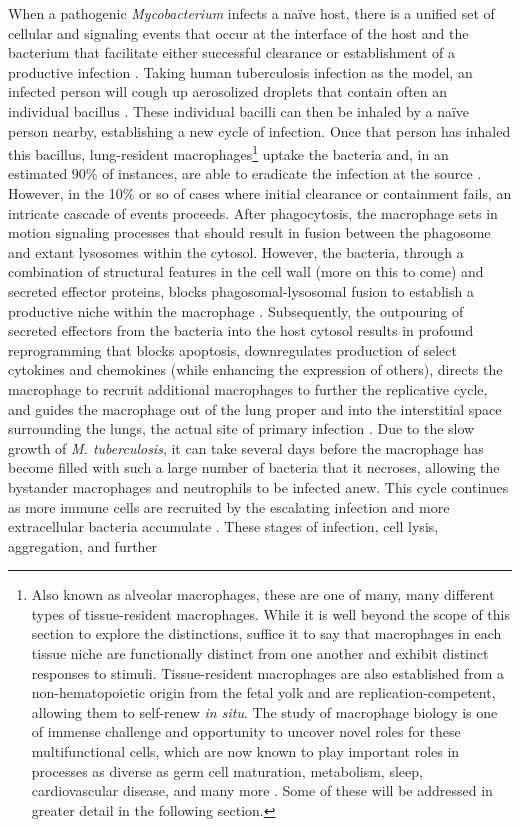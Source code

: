 When a pathogenic \textit{Mycobacterium} infects a na\"{i}ve host, there is a unified set of cellular and signaling events that occur at the interface of the host and the bacterium that facilitate either successful clearance or establishment of a productive infection \citep{Davies2001, Bohrer2021, Gagneux2006, Turner2017}. Taking human tuberculosis infection as the model, an infected person will cough up aerosolized droplets that contain often an individual bacillus \citep{Churchyard2017, Mathema2017}. These individual bacilli can then be inhaled by a na\"{i}ve person nearby, establishing a new cycle of infection. Once that person has inhaled this bacillus, lung-resident macrophages\footnote{Also known as alveolar macrophages, these are one of many, many different types of tissue-resident macrophages. While it is well beyond the scope of this section to explore the distinctions, suffice it to say that macrophages in each tissue niche are functionally distinct from one another and exhibit distinct responses to stimuli. Tissue-resident macrophages are also established from a non-hematopoietic origin from the fetal yolk and are replication-competent, allowing them to self-renew \textit{in situ}. The study of macrophage biology is one of immense challenge and opportunity to uncover novel roles for these multifunctional cells, which are now known to play important roles in processes as diverse as germ cell maturation, metabolism, sleep, cardiovascular disease, and many more \citep{Davies2013, Hussell2014}. Some of these will be addressed in greater detail in the following section.} uptake the bacteria and, in an estimated 90\% of instances, are able to eradicate the infection at the source \citep{Verrall2014, OGarra2014}. However, in the 10\% or so of cases where initial clearance or containment fails, an intricate cascade of events proceeds. After phagocytosis, the macrophage sets in motion signaling processes that should result in fusion between the phagosome and extant lysosomes within the cytosol. However, the bacteria, through a combination of structural features in the cell wall (more on this to come) and secreted effector proteins, blocks phagosomal-lysosomal fusion to establish a productive niche within the macrophage \citep{McDonough1993, Pieters2008}. Subsequently, the outpouring of secreted effectors from the bacteria into the host cytosol results in profound reprogramming that blocks apoptosis, downregulates production of select cytokines and chemokines (while enhancing the expression of others), directs the macrophage to recruit additional macrophages to further the replicative cycle, and guides the macrophage out of the lung proper and into the interstitial space surrounding the lungs, the actual site of primary infection \citep{Peters2003, Upadhyay2018, Ramakrishnan2012, Cohen2018}. Due to the slow growth of \textit{M. tuberculosis}, it can take several days before the macrophage has become filled with such a large number of bacteria that it necroses, allowing the bystander macrophages and neutrophils to be infected anew. This cycle continues as more immune cells are recruited by the escalating infection and more extracellular bacteria accumulate \citep{Cadena2006, Lin2006, Corleis2020, Orme2014}. These stages of infection, cell lysis, aggregation, and further 